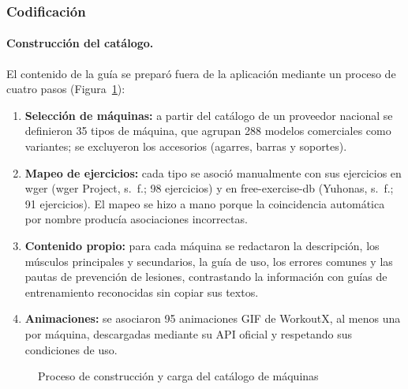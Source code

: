 \subsubsection{Codificación}

\paragraph{Construcción del catálogo.} El contenido de la guía se preparó
fuera de la aplicación mediante un proceso de cuatro pasos
(Figura~\ref{fig:pipeline-catalogo}):

\begin{enumerate}
    \item \textbf{Selección de máquinas:} a partir del catálogo de un
    proveedor nacional se definieron 35 tipos de máquina, que agrupan 288
    modelos comerciales como variantes; se excluyeron los accesorios
    (agarres, barras y soportes).
    \item \textbf{Mapeo de ejercicios:} cada tipo se asoció manualmente con
    sus ejercicios en wger (wger Project, s.~f.; 98 ejercicios) y en free-exercise-db
    (Yuhonas, s.~f.; 91 ejercicios). El mapeo se hizo a mano porque la coincidencia automática por
    nombre producía asociaciones incorrectas.
    \item \textbf{Contenido propio:} para cada máquina se redactaron la
    descripción, los músculos principales y secundarios, la guía de uso, los
    errores comunes y las pautas de prevención de lesiones, contrastando la
    información con guías de entrenamiento reconocidas sin copiar sus textos.
    \item \textbf{Animaciones:} se asociaron 95 animaciones GIF de WorkoutX,
    al menos una por máquina, descargadas mediante su API oficial y
    respetando sus condiciones de uso.
\end{enumerate}

\begin{figure}[H]
\centering
{}
\caption{Proceso de construcción y carga del catálogo de máquinas}
\label{fig:pipeline-catalogo}
\end{figure}

